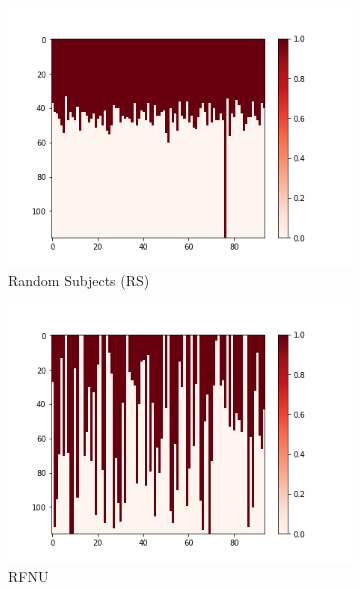 \documentclass[10pt, conference, compsocconf]{IEEEtran}
\begin{document}
\begin{figure}[h!]
        \begin{subfigure}[b]{0.4\linewidth}
                 \includegraphics[width=\columnwidth]{figures/5vs7_random-real_04_training}
                \caption{Random Subjects (RS)}
                  \label{fig:Uniform-S-Sample-Training-set}
        \end{subfigure}
        \begin{subfigure}[b]{0.4\linewidth}
                  \includegraphics[width=\columnwidth]{figures/5vs7_diagonal_04_training}
                  \caption{RFNU}
                  \label{fig:Diagonal-Sample-Training-set}
        \end{subfigure}
        \begin{subfigure}[b]{0.4\linewidth}

\end{subfigure}
\end{figure}
\end{document}
